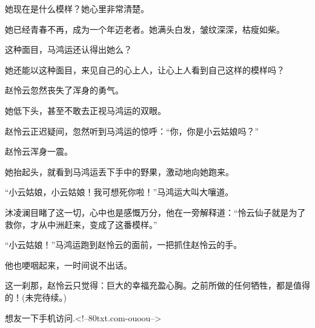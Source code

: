 \begin{this_body}
她现在是什么模样？她心里非常清楚。

她已经青春不再，成为一个年迈老者。她满头白发，皱纹深深，枯瘦如柴。

这种面目，马鸿运还认得出她么？

她还能以这种面目，来见自己的心上人，让心上人看到自己这样的模样吗？

赵怜云忽然丧失了浑身的勇气。

她低下头，甚至不敢去正视马鸿运的双眼。

赵怜云正迟疑间，忽然听到马鸿运的惊呼：“你，你是小云姑娘吗？”

赵怜云浑身一震。

她抬起头，就看到马鸿运丢下手中的野果，激动地向她跑来。

“小云姑娘，小云姑娘！我可想死你啦！”马鸿运大叫大嚷道。

沐凌澜目睹了这一切，心中也是感慨万分，他在一旁解释道：“怜云仙子就是为了救你，才从中洲赶来，变成了这番模样。”

“小云姑娘！”马鸿运跑到赵怜云的面前，一把抓住赵怜云的手。

他也哽咽起来，一时间说不出话。

这一刹那，赵怜云只觉得：巨大的幸福充盈心胸。之前所做的任何牺牲，都是值得的！(未完待续。)

想友一下手机访问.<!--80txt.com-ouoou-->

\end{this_body}

